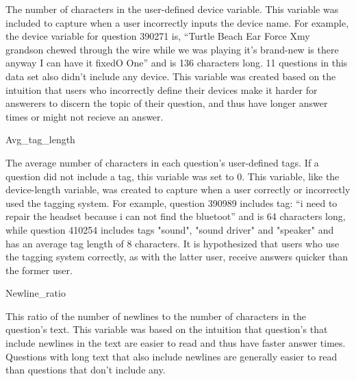 \documentclass[12pt]{article}
\begin{document}
The number of characters in the user-defined device variable. This variable was included to capture when a user incorrectly inputs the device name. For example, the device variable for question 390271 is, “Turtle Beach Ear Force Xmy grandson chewed through the wire while we was playing it's brand-new is there anyway I can have it fixedO One” and is 136 characters long. 11 questions in this data set also didn’t include any device. This variable was created based on the intuition that users who incorrectly define their devices make it harder for answerers to discern the topic of their question, and thus have longer answer times or might not recieve an answer.

Avg\_tag\_length

The average number of characters in each question's user-defined tags. If a question did not include a tag, this variable was set to 0. This variable, like the device-length variable, was created to capture when a user correctly or incorrectly used the tagging system. For example, question 390989 includes tag: “i need to repair the headset because i can not find the bluetoot” and is 64 characters long, while question 410254 includes tags "sound", "sound driver" and "speaker" and has an average tag length of 8 characters. It is hypothesized that users who use the tagging system correctly, as with the latter user, receive answers quicker than the former user. 

Newline\_ratio

This ratio of the number of newlines to the number of characters in the question's text. This variable was based on the intuition that question's that include newlines in the text are easier to read and thus have faster answer times. Questions with long text that also include newlines are generally easier to read than questions that don’t include any. 



\end{document}
